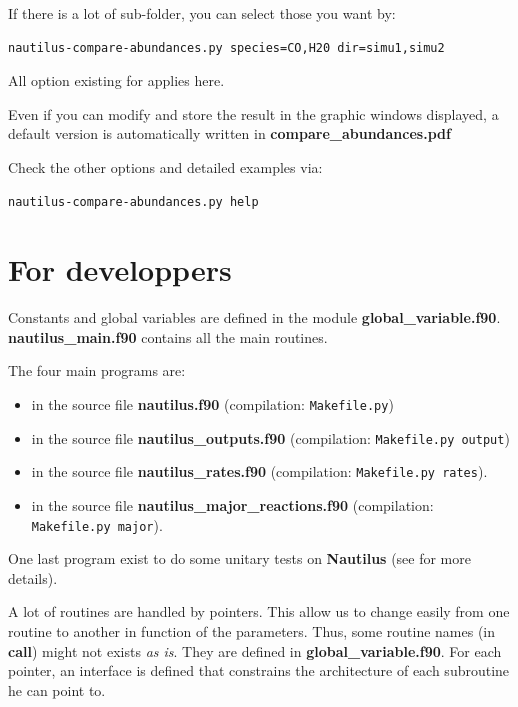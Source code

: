 \documentclass[english,a4paper,twoside]{article}
\begin{document}
If there is a lot of sub-folder, you can select those you want by:
\begin{verbatim}
nautilus-compare-abundances.py species=CO,H20 dir=simu1,simu2
\end{verbatim}

All option existing for  applies here.

Even if you can modify and store the result in the graphic windows displayed, a default version is automatically written in \textbf{compare\_abundances.pdf} 

Check the other options and detailed examples via:
\begin{verbatim}
nautilus-compare-abundances.py help
\end{verbatim}

\section{For developpers}\label{sec:advanced}
Constants and global variables are defined in the module \textbf{global\_variable.f90}. \textbf{nautilus\_main.f90} contains all the main routines. 

The four main programs are:
\begin{itemize}
\item {} in the source file \textbf{nautilus.f90} (compilation:  \verb|Makefile.py|)
\item {} in the source file \textbf{nautilus\_outputs.f90} (compilation: \verb|Makefile.py output|)
\item {} in the source file \textbf{nautilus\_rates.f90} (compilation: \verb|Makefile.py rates|).
\item {} in the source file \textbf{nautilus\_major\_reactions.f90} (compilation: \verb|Makefile.py major|).
\end{itemize}

One last program exist to do some unitary tests on \textbf{Nautilus} (see  for more details).

A lot of routines are handled by pointers. This allow us to change easily from one routine to another in function of the parameters. Thus, some routine names (in \textbf{call}) might not exists \emph{as is}. They are defined in \textbf{global\_variable.f90}. For each pointer, an interface is defined that constrains the architecture of each subroutine he can point to. 
\end{document}
